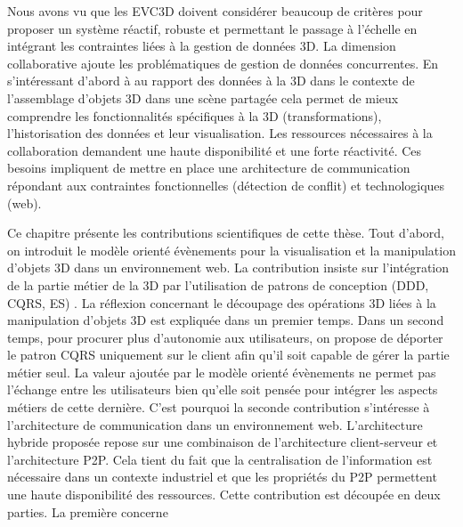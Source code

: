 
Nous avons vu que les \gls{EVC3D} doivent considérer beaucoup de critères pour 
proposer un système réactif, robuste et permettant le passage à l'échelle en 
intégrant les contraintes liées à la gestion de données 3D. La dimension 
collaborative ajoute les problématiques de gestion de données concurrentes.
En s'intéressant d'abord à au rapport des données à la 3D dans le contexte de 
l'assemblage d'objets 3D dans une scène partagée cela permet de 
mieux comprendre les fonctionnalités spécifiques à la 3D (transformations), 
l'historisation des données et leur visualisation. Les ressources nécessaires à la 
collaboration demandent une haute disponibilité et une forte réactivité. Ces 
besoins impliquent de mettre en place une architecture de communication 
répondant aux contraintes fonctionnelles (détection de conflit) et technologiques 
(web).

Ce chapitre présente les contributions scientifiques de cette thèse.
Tout d'abord, on introduit le modèle orienté évènements pour la 
visualisation et la manipulation d'objets 3D dans un environnement web. La 
contribution insiste sur l'intégration de la partie métier de la 3D par l'utilisation de 
patrons de conception (\gls{DDD}, \gls{CQRS}, \gls{ES}) . La réflexion concernant 
le découpage des opérations 3D liées à la manipulation d'objets 3D est expliquée 
dans un premier temps. Dans un second temps, pour procurer plus d'autonomie 
aux utilisateurs, on propose de déporter le patron \gls{CQRS} uniquement sur le 
client afin qu'il soit capable de gérer la partie métier seul. La valeur ajoutée par le 
modèle orienté évènements ne permet pas l'échange entre les utilisateurs bien 
qu'elle soit pensée pour intégrer les aspects métiers de cette dernière. 
C'est pourquoi la seconde contribution s'intéresse à l'architecture de 
communication dans un environnement web. L'architecture hybride proposée 
repose sur une combinaison de l'architecture client-serveur et l'architecture P2P. 
Cela tient du fait que la centralisation de l'information est nécessaire dans un 
contexte industriel et que les propriétés du P2P permettent une haute disponibilité 
des ressources. Cette contribution est découpée en deux parties. La première 
concerne 

